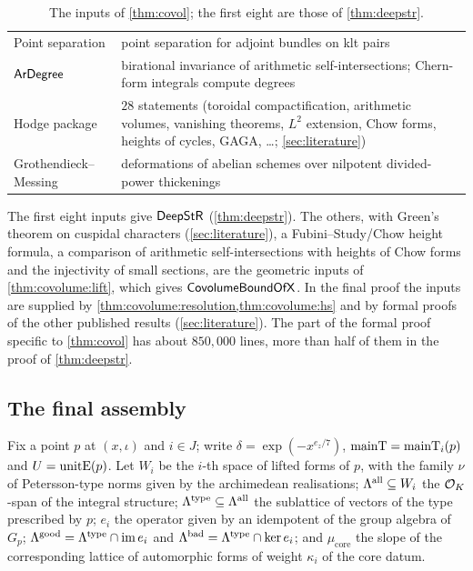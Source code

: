\begin{table}[htbp]
\begin{tabular}{@{}>{\raggedright\arraybackslash}p{2.8cm}>{\raggedright\arraybackslash}p{12.2cm}@{}}
Point separation & point separation for adjoint bundles on klt pairs \cite{AngehrnSiu1995,Lazarsfeld2004}\\
$\mathsf{ArDegree}$ & birational invariance of arithmetic self-intersections; Chern-form integrals
compute degrees \cite{GilletSoule1990}\\
Hodge package & $28$ statements (toroidal compactification, arithmetic volumes, vanishing theorems,
$L^2$ extension, Chow forms, heights of cycles, GAGA, \dots; \cref{sec:literature})\\
Grothendieck--Messing & deformations of abelian schemes over nilpotent divided-power thickenings
\cite{Messing1972}\\
\bottomrule
\end{tabular}
\caption{The inputs of \cref{thm:covol}; the first eight are those of \cref{thm:deepstr}.}
\label{tab:covolume:inputs}
\end{table}

\begin{proofoutline}
The first eight inputs give $\mathsf{DeepStR}$ (\cref{thm:deepstr}). The others, with Green's theorem on
cuspidal characters (\cref{sec:literature}), a Fubini--Study/Chow height formula, a comparison of
arithmetic self-intersections with heights of Chow forms and the injectivity of small sections, are the
geometric inputs of \cref{thm:covolume:lift}, which gives $\mathsf{CovolumeBoundOfX}$. In the final
proof the inputs are supplied by \cref{thm:covolume:resolution,thm:covolume:hs} and by formal proofs of
the other published results (\cref{sec:literature}). The part of the formal proof specific to
\cref{thm:covol} has about $850{,}000$ lines, more than half of them in the proof of \cref{thm:deepstr}.
\end{proofoutline}

\subsection{The final assembly}\label{sec:covolume:assembly}

Fix a point $p$ at $(x,\iota)$ and $i\in J$; write $\delta=\exp(-x^{e_z/7})$,
$\mathrm{mainT}=\mathrm{mainT}_i(p)$ and $U=\mathrm{unitE}(p)$. Let $W_i$ be the $i$-th space of lifted
forms of $p$, with the family $\nu$ of Petersson-type norms given by the archimedean realisations;
$\Lambda^{\mathrm{all}}\subseteq W_i$ the $\mathcal{O}_K$-span of the integral structure;
$\Lambda^{\mathrm{type}}\subseteq\Lambda^{\mathrm{all}}$ the sublattice of vectors of the type prescribed by $p$;
$e_i$ the operator given by an idempotent of the group algebra of $G_p$;
$\Lambda^{\mathrm{good}}=\Lambda^{\mathrm{type}}\cap\operatorname{im}e_i$ and
$\Lambda^{\mathrm{bad}}=\Lambda^{\mathrm{type}}\cap\ker e_i$; and $\mu_{\mathrm{core}}$ the slope of the
corresponding lattice of automorphic forms of weight $\kappa_i$ of the core datum.


